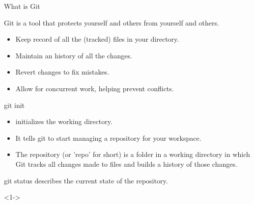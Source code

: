 \begin{frame}[fragile]{What is Git}
			
	Git is a tool that protects yourself and others from yourself and others.
		
	\begin{itemize}
		\item <2-> Keep record of all the (tracked) files in your directory.
		\item <3-> Maintain an history of all the changes.
		\item <4-> Revert changes to fix mistakes.
		\item <5-> Allow for concurrent work, helping prevent conflicts.
	\end{itemize}
		
			
\end{frame}

\begin{frame}[fragile]{git init}
	\begin{itemize}[<+->]
		\item  {} initializes the working directory.
		      		      
		\item It tells git to start managing a \alert{repository} for your workspace.
		      		       
		\item The repository (or 'repo' for short) is a folder in a working directory in which Git tracks all changes made to files and builds a history of those changes.
		      		       
	\end{itemize}
\end{frame}

\begin{frame}[fragile]{git status}
     describes the current state of the repository.

	\begin{codeblock}<1->{
}\end{codeblock}
		      		       
\end{frame}

